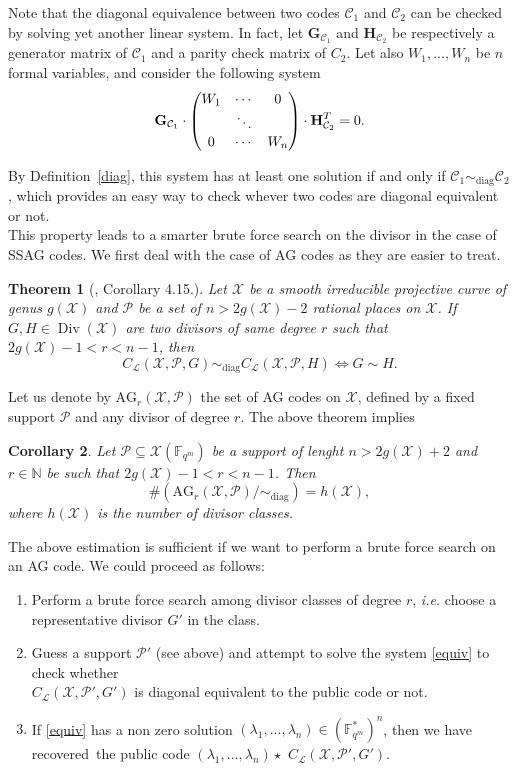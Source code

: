 \documentclass[10pt]{article}
\newtheorem{thm}{Theorem}
\newtheorem{coro1}[thm]{Corollary}
\theoremstyle{definition}
\theoremstyle{definition}
\theoremstyle{definition}
\newcommand{\cd}{\cdot}
\newcommand{\C}{\mathcal{C}}
\newcommand{\N}{\mathbb{N}}
\newcommand{\Fqm}{\mathbb{F}_{q^m}}
\newcommand{\su}{\subseteq}
\newcommand{\X}{\mathcal{X}}
\newcommand{\PR}{\mathcal{P}}
\newcommand{\Div}{\operatorname{Div}}
\newcommand{\calL}{\mathcal{L}}
\begin{document}
Note that the diagonal equivalence between two codes $\C_1$ and $\C_2$ can be checked by solving yet another linear system. In fact, let $\mathbf{G}_{\C_1}$ and $\mathbf{H}_{\C_2}$ be respectively a generator matrix of $\C_1$ and a parity check matrix of $C_2$. Let also $W_1,...,W_n$ be $n$ formal variables, and consider the following system
\begin{equation} \label{equiv}
\mathbf{G}_{\C_1} \cd \begin{pmatrix}
W_1 & \cdots & 0 \\
\null & \ddots & \null \\
0 & \cdots & W_n
\end{pmatrix} \cd \mathbf{H}_{\C_2}^T = 0.
\end{equation}

 By Definition~\ref{diag}, this system has at least one solution if and only if $\C_1 \sim_{\mathrm{diag}} \C_2$, which provides an easy way to check whever two codes are diagonal equivalent or not. \\
This property leads to a smarter brute force search on the divisor in the case of SSAG codes. We first deal with the case of AG codes as they are easier to treat. 

\begin{thm} [\cite{CMRP}, Corollary 4.15.]  \label{thmequiv}
Let $\X$ be a smooth irreducible projective curve of genus $g(\X)$ and $\PR$ be a set of $n>2g(\X)-2$ rational places on $\X$. If $G,H \in \Div(\X)$ are two divisors of same degree $r$ such that $2g(\X)-1 < r < n-1$, then  
\[C_{\calL}(\X,\PR,G) \sim_{\mathrm{diag}} C_{\calL}(\X,\PR,H) \iff G \sim H.\]
\end{thm}

Let us denote by $\mathrm{AG}_r(\X,\PR)$ the set of AG codes on $\X$, defined by a fixed support $\PR$ and any divisor of degree $r$. The above theorem implies

\begin{coro1} \label{nbAGr}
Let $\PR \su \X(\Fqm)$ be a support of lenght $n > 2g(\X)+2$ and $r \in \N$ be such that $2g(\X)-1 < r < n-1$. Then 
\[ \#\left(\mathrm{AG}_r(\X,\PR)/ \sim_{\mathrm{diag}}\right)= h(\X),\]
where $h(\X)$ is the number of divisor classes.
\end{coro1}

The above estimation is sufficient if we want to perform a brute force search on an AG code. We could proceed as follows:
\begin{enumerate}
\item Perform a brute force search among divisor classes of degree $r$, \textit{i.e.} choose a representative divisor $G'$ in the class.
\item Guess a support $\PR'$ (see above) and attempt to solve the system \eqref{equiv} to check whether \\ $C_{\calL}(\X,\PR',G')$ is diagonal equivalent to the public code or not.
\item If \eqref{equiv} has a non zero solution $(\lambda_1,...,\lambda_n) \in (\Fqm^*)^n$, then we have recovered~the public code $(\lambda_1,...,\lambda_n) \star$ $C_{\calL}(\X,\PR',G')$.
\end{enumerate}
\end{document}
